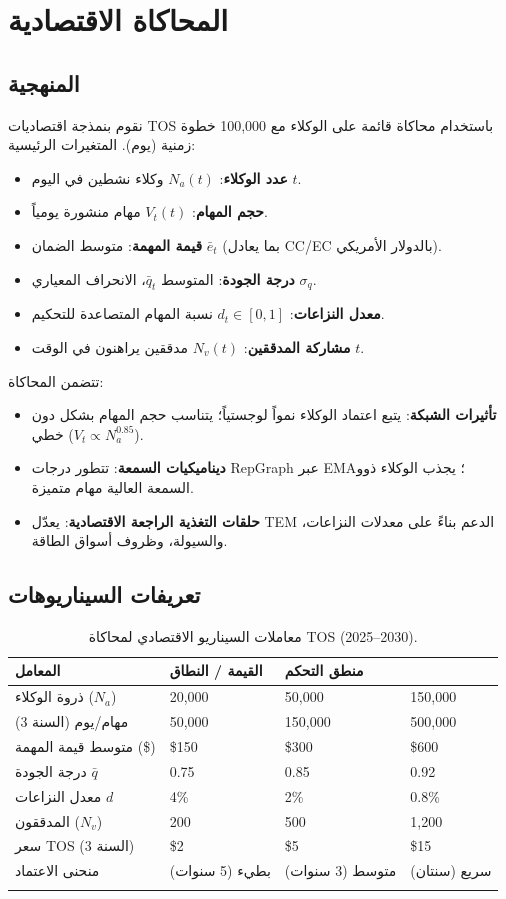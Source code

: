 \documentclass[11pt]{article}
\begin{document}
\section{المحاكاة الاقتصادية}
\label{sec:econ-sim}

\subsection{المنهجية}
نقوم بنمذجة اقتصاديات TOS باستخدام محاكاة قائمة على الوكلاء مع 100,000 خطوة زمنية (يوم). المتغيرات الرئيسية:
\begin{itemize}[noitemsep]
  \item \textbf{عدد الوكلاء}: $N_a(t)$ وكلاء نشطين في اليوم $t$.
  \item \textbf{حجم المهام}: $V_t(t)$ مهام منشورة يومياً.
  \item \textbf{قيمة المهمة}: متوسط الضمان $\bar{e}_t$ (بما يعادل CC/EC بالدولار الأمريكي).
  \item \textbf{درجة الجودة}: المتوسط $\bar{q}_t$، الانحراف المعياري $\sigma_q$.
  \item \textbf{معدل النزاعات}: $d_t \in [0,1]$ نسبة المهام المتصاعدة للتحكيم.
  \item \textbf{مشاركة المدققين}: $N_v(t)$ مدققين يراهنون في الوقت $t$.
\end{itemize}
تتضمن المحاكاة:
\begin{itemize}[noitemsep]
  \item \textbf{تأثيرات الشبكة}: يتبع اعتماد الوكلاء نمواً لوجستياً؛ يتناسب حجم المهام بشكل دون خطي ($V_t \propto N_a^{0.85}$).
  \item \textbf{ديناميكيات السمعة}: تتطور درجات RepGraph عبر EMA؛ يجذب الوكلاء ذوو السمعة العالية مهام متميزة.
  \item \textbf{حلقات التغذية الراجعة الاقتصادية}: يعدّل TEM الدعم بناءً على معدلات النزاعات، والسيولة، وظروف أسواق الطاقة.
\end{itemize}

\subsection{تعريفات السيناريوهات}
\begin{longtable}{@{}p{}p{}p{}p{}@{}}
\toprule
\textbf{المعامل} & \textbf{القيمة / النطاق} & \textbf{منطق التحكم} \\ \midrule
ذروة الوكلاء ($N_a$) & 20,000 & 50,000 & 150,000 \\
مهام/يوم (السنة 3) & 50,000 & 150,000 & 500,000 \\
متوسط قيمة المهمة (\$) & \$150 & \$300 & \$600 \\
درجة الجودة $\bar{q}$ & 0.75 & 0.85 & 0.92 \\
معدل النزاعات $d$ & 4\% & 2\% & 0.8\% \\
المدققون ($N_v$) & 200 & 500 & 1,200 \\
سعر TOS (السنة 3) & \$2 & \$5 & \$15 \\
منحنى الاعتماد & بطيء (5 سنوات) & متوسط (3 سنوات) & سريع (سنتان) \\\bottomrule
\caption{معاملات السيناريو الاقتصادي لمحاكاة TOS (2025--2030).}
\label{tab:econ-scenarios}
\end{longtable}
\end{document}
